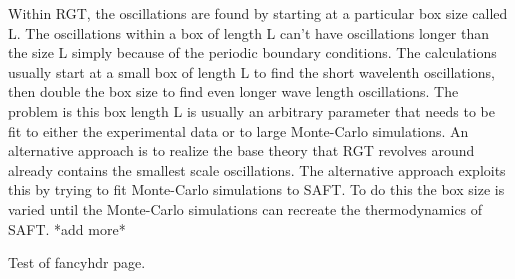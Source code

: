 Within RGT, the oscillations are found by starting at a particular box size called L. The oscillations within a box of length L can't have oscillations longer than the size L simply because of the periodic boundary conditions. The calculations usually start at a small box of length L to find the short wavelenth oscillations, then double the box size to find even longer wave length oscillations. The problem is this box length L is usually an arbitrary parameter that needs to be fit to either the experimental data or to large Monte-Carlo simulations. An alternative approach is to realize the base theory that RGT revolves around already contains the smallest scale oscillations. The alternative approach exploits this by trying to fit Monte-Carlo simulations to SAFT. To do this the box size is varied until the Monte-Carlo simulations can recreate the thermodynamics of SAFT. *add more*

\newpage

Test of fancyhdr page.
